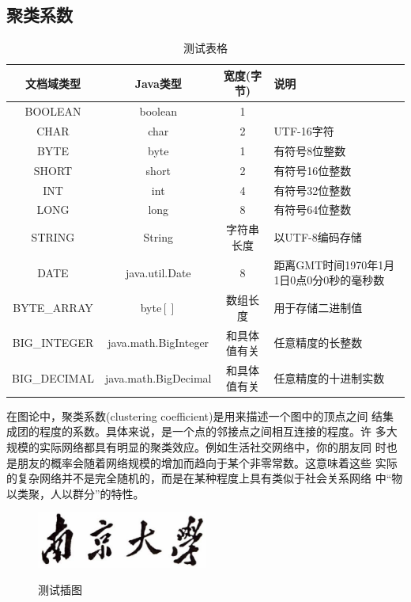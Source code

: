 \documentclass[master]{njuthesis}
\begin{document}
\subsection{聚类系数}

\begin{table}
  \centering
  \begin{tabular}{cccp{38mm}}
    \toprule
    \textbf{文档域类型} & \textbf{Java类型} & \textbf{宽度(字节)} & \textbf{说明} \\
    \midrule
    BOOLEAN  & boolean &  1  & \\
    CHAR     & char    &  2  & UTF-16字符 \\
    BYTE     & byte    &  1  & 有符号8位整数 \\
    SHORT    & short   &  2  & 有符号16位整数 \\
    INT      & int     &  4  & 有符号32位整数 \\
    LONG     & long    &  8  & 有符号64位整数 \\
    STRING   & String  &  字符串长度  & 以UTF-8编码存储 \\
    DATE     & java.util.Date & 8 & 距离GMT时间1970年1月1日0点0分0秒的毫秒数 \\
    BYTE\_ARRAY & byte$[]$ & 数组长度 & 用于存储二进制值 \\
    BIG\_INTEGER & java.math.BigInteger & 和具体值有关 & 任意精度的长整数 \\
    BIG\_DECIMAL & java.math.BigDecimal & 和具体值有关 & 任意精度的十进制实数 \\
    \bottomrule
  \end{tabular}
  \caption{测试表格}\label{table:test3}
\end{table}

在图论中，聚类系数(clustering coefficient)是用来描述一个图中的顶点之间
结集成团的程度的系数。具体来说，是一个点的邻接点之间相互连接的程度。许
多大规模的实际网络都具有明显的聚类效应。例如生活社交网络中，你的朋友同
时也是朋友的概率会随着网络规模的增加而趋向于某个非零常数。这意味着这些
实际的复杂网络并不是完全随机的，而是在某种程度上具有类似于社会关系网络
中“物以类聚，人以群分”的特性。

\begin{figure}[htbp]
  \centering
  \includegraphics[width= 0.5\textwidth]{njuname.eps}\\
  \caption{测试插图}\label{fig:test4}
\end{figure}
\end{document}
